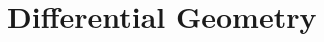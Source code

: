 \documentclass[11pt,openany]{article}
\begin{document}
%		
%		
%		

\newpage
\appendix
\section{Differential Geometry}
\end{document}
